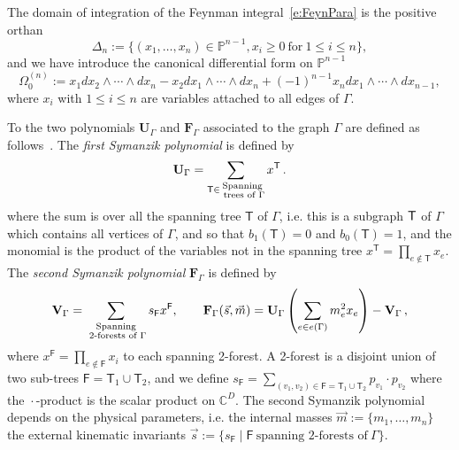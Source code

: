 \documentclass[a4paper,12pt]{article}
\numberwithin{equation}{section}
\numberwithin{figure}{section}
\begin{document}
The domain of integration of the Feynman integral~\eqref{e:FeynPara}  is the positive orthan
\begin{equation}\label{e:Deltan}
  \Delta_n:=\{(x_1,\dots,x_n)\in \mathbb P^{n-1}, x_i \geq0 ~\textrm{for}~ 1\leq
            i\leq n\},
          \end{equation}
          and we have introduce the canonical differential form on
          $\mathbb P^{n-1}$ 
\begin{equation}
 \Omega_0^{(n)}:=   x_1 dx_2\wedge \cdots \wedge dx_n- x_2
                dx_1\wedge\cdots \wedge dx_n+(-1)^{n-1}  x_n dx_1\wedge \cdots \wedge dx_{n-1}  ,
              \end{equation}
where $x_i$ with $1\leq i\leq n$  are  variables attached to all edges of
$\Gamma$.

To the two polynomials $\textbf{U}_\Gamma$ and $\textbf{F}_\Gamma$
associated to the graph $\Gamma$ are defined as
follows~\cite{nakanishi1971graph,Weinzierl:2022eaz}.  The {\em first
  Symanzik polynomial} is defined by
\begin{equation}\label{e:Udef}
{\bf U}_\Gamma = \sum_{\mathsf{T} \in \substack{ \text{Spanning} \\ \text{ trees of } \Gamma}} x^{\mathsf{T}}\,.
\end{equation}
where the sum is over all the spanning tree $\mathsf{T}$ of $\Gamma$,
i.e.  this is a subgraph ${\sf T}$ of $\Gamma$ which contains all
vertices of $\Gamma$, and so that $b_1(\mathsf{T}) =0$ and
$b_0(\mathsf{T})=1$, and the
monomial is the product of the variables not in the spanning tree
$x^{\mathsf{T}} = \prod_{e\notin {\mathsf{T}}} x_e$. 
The {\em second 
  Symanzik polynomial}  $\textbf{F}_\Gamma$ is defined by
\begin{equation}\label{e:VFdef}
{\bf V}_{\Gamma} = \sum_{\substack{ \text{Spanning} \\ \text{ 2-forests
      of } \Gamma}}s_{\mathsf{F}} x^{\mathsf{F}}  ,\qquad {\bf F}_{\Gamma}(\vec{s}, \vec{m}) = {\bf U}_\Gamma\left( \sum_{e \in e(\Gamma)} m_e^2 x_e\right) - {\bf V}_{\Gamma}\,,
\end{equation}
where $x^{\mathsf{F}} =
\prod_{e \notin \mathsf{F}} x_i$ to each spanning 2-forest. A 2-forest
is a disjoint union of two sub-trees $\mathsf{F}=\mathsf{T}_1\cup \mathsf{T}_2$,  and we define $s_\mathsf{F} = \sum_{(v_1,v_2) \in \mathsf{F}=\mathsf{T}_1\cup \mathsf{T}_2} p_{v_1}\cdot p_{v_2}$ where the ${}\cdot{}$-product is the
scalar product on $\mathbb {C}^{D}$.
The second Symanzik polynomial depends on the physical parameters,
i.e. the
internal masses $\vec m:=\{m_1,\dots,m_n\}$ the external kinematic invariants
$\vec s:=\{s_\textsf{F} \mid \textsf{F} ~ \textrm{spanning
2-forests of}~\Gamma\}$.
\end{document}
